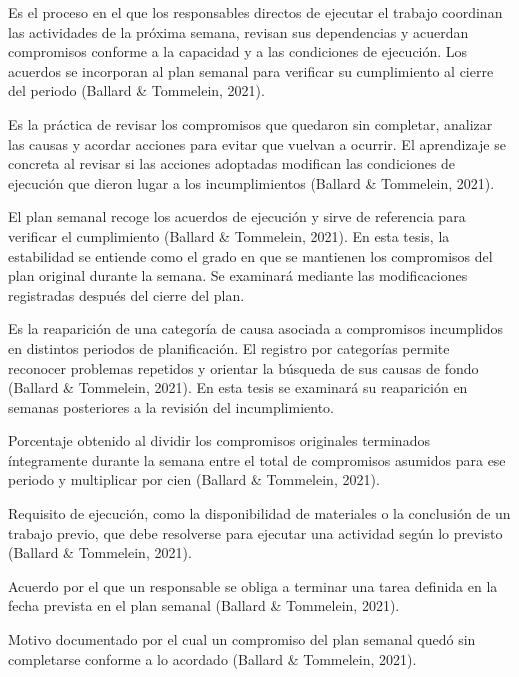 \documentclass[12pt,a4paper]{article}
\begin{document}
Es el proceso en el que los responsables directos de ejecutar el trabajo coordinan las actividades de la próxima semana, revisan sus dependencias y acuerdan compromisos conforme a la capacidad y a las condiciones de ejecución. Los acuerdos se incorporan al plan semanal para verificar su cumplimiento al cierre del periodo (Ballard \& Tommelein, 2021).

Es la práctica de revisar los compromisos que quedaron sin completar, analizar las causas y acordar acciones para evitar que vuelvan a ocurrir. El aprendizaje se concreta al revisar si las acciones adoptadas modifican las condiciones de ejecución que dieron lugar a los incumplimientos (Ballard \& Tommelein, 2021).

El plan semanal recoge los acuerdos de ejecución y sirve de referencia para verificar el cumplimiento (Ballard \& Tommelein, 2021). En esta tesis, la estabilidad se entiende como el grado en que se mantienen los compromisos del plan original durante la semana. Se examinará mediante las modificaciones registradas después del cierre del plan.

Es la reaparición de una categoría de causa asociada a compromisos incumplidos en distintos periodos de planificación. El registro por categorías permite reconocer problemas repetidos y orientar la búsqueda de sus causas de fondo (Ballard \& Tommelein, 2021). En esta tesis se examinará su reaparición en semanas posteriores a la revisión del incumplimiento.

Porcentaje obtenido al dividir los compromisos originales terminados íntegramente durante la semana entre el total de compromisos asumidos para ese periodo y multiplicar por cien (Ballard \& Tommelein, 2021).

Requisito de ejecución, como la disponibilidad de materiales o la conclusión de un trabajo previo, que debe resolverse para ejecutar una actividad según lo previsto (Ballard \& Tommelein, 2021).

Acuerdo por el que un responsable se obliga a terminar una tarea definida en la fecha prevista en el plan semanal (Ballard \& Tommelein, 2021).

Motivo documentado por el cual un compromiso del plan semanal quedó sin completarse conforme a lo acordado (Ballard \& Tommelein, 2021).
\end{document}
